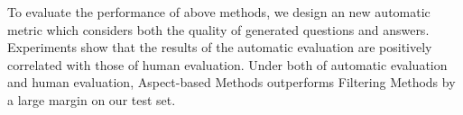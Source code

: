 To evaluate the performance of above methods, we design an new automatic metric which considers both the quality of generated questions and answers. 
Experiments show that the results of the automatic evaluation are positively correlated with those of human evaluation.
Under both of automatic evaluation and human evaluation, Aspect-based Methods outperforms Filtering Methods by a large margin on our test set.



